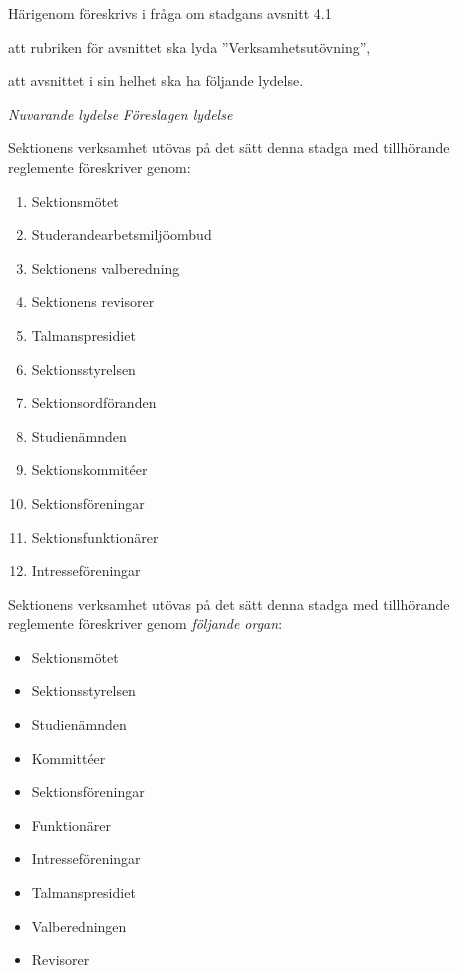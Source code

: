 \documentclass{article}
\newenvironment{lydelse}
    {\begin{paracol}{2}%
        \emph{Nuvarande lydelse}%
        \switchcolumn%
        \emph{Föreslagen lydelse}%
    \end{paracol}%
    \begin{enumerate}[label=\thesubsection.\arabic*]%
    \begin{paracol}{2}%
    }{\end{paracol}\end{enumerate}}
\begin{document}
Härigenom föreskrivs i fråga om stadgans avsnitt 4.1
\begin{dels}
    \item att rubriken för avsnittet ska lyda ''Verksamhetsutövning'',
    \item att avsnittet i sin helhet ska ha följande lydelse.
\end{dels}

\begin{lydelse}
    \item Sektionens verksamhet ut\-övas på det sätt denna stadga med
   till\-hör\-ande regle\-mente föreskriver genom:
      \begin{enumerate}[label=\arabic*]
       \item Sektionsmötet
       \item Studerandearbetsmiljöombud
       \item Sektionens valberedning
       \item Sektionens revisorer
       \item Talmanspresidiet
       \item Sektionsstyrelsen
	   \item Sektionsordföranden
       \item Studienämnden
       \item Sektionskommitéer
       \item Sektionsföreningar
       \item Sektionsfunktionärer
       \item Intresseföreningar
      \end{enumerate}
    
  \switchcolumn
  \setcounter{enumi}{0}
    
    \item Sektionens verksamhet utövas på det sätt denna stadga med
   tillhörande reglemente föreskriver genom \emph{följande organ}:
      \begin{itemize}
       \item Sektionsmötet
       \item Sektionsstyrelsen
       \item Studienämnden
       \item Kommittéer
       \item Sektionsföreningar
       \item Funktionärer
       \item Intresseföreningar
       \item Talmanspresidiet
       \item Valberedningen
       \item Revisorer
      \end{itemize}
    

\end{lydelse}
\end{document}
